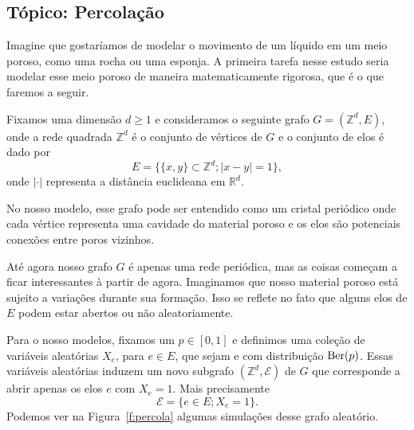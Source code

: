 \begin{topics}

\section{Tópico: Percolação}
\label{s:percolacao}

Imagine que gostaríamos de modelar o movimento de um líquido em um meio poroso, como uma rocha ou uma esponja.
A primeira tarefa nesse estudo seria modelar esse meio poroso de maneira matematicamente rigorosa, que é o que faremos a seguir.

Fixamos uma dimensão $d \geq 1$ e consideramos o seguinte grafo $G = (\mathbb{Z}^d, E)$, onde a rede quadrada $\mathbb{Z}^d$ é o conjunto de vértices de $G$ e o conjunto de elos é dado por
\begin{equation*}
  E = \big\{ \{x, y\} \subset \mathbb{Z}^d; |x - y| = 1 \},
\end{equation*}
onde $|\cdot|$ representa a distância euclideana em $\mathbb{R}^d$.

No nosso modelo, esse grafo pode ser entendido como um cristal periódico onde cada vértice representa uma cavidade do material poroso e os elos são potenciais conexões entre poros vizinhos.

Até agora nosso grafo $G$ é apenas uma rede periódica, mas as coisas começam a ficar interessantes à partir de agora.
Imaginamos que nosso material poroso está sujeito a variações durante sua formação.
Isso se reflete no fato que alguns elos de $E$ podem estar abertos ou não aleatoriamente.

Para o nosso modelos, fixamos um $p \in [0,1]$ e definimos uma coleção de variáveis aleatórias $X_e$, para $e \in E$, que sejam \iid e com distribuição $\operatorname{Ber}(p)$.
Essas variáveis aleatórias induzem um novo subgrafo $(\mathbb{Z}^d, \mathcal{E})$ de $G$ que corresponde a abrir apenas os elos $e$ com $X_e = 1$.
Mais precisamente
\begin{equation}
  \mathcal{E} = \big\{ e \in E; X_e = 1 \big\}.
\end{equation}
Podemos ver na Figura~\ref{f:percola} algumas simulações desse grafo aleatório.


\end{topics}

